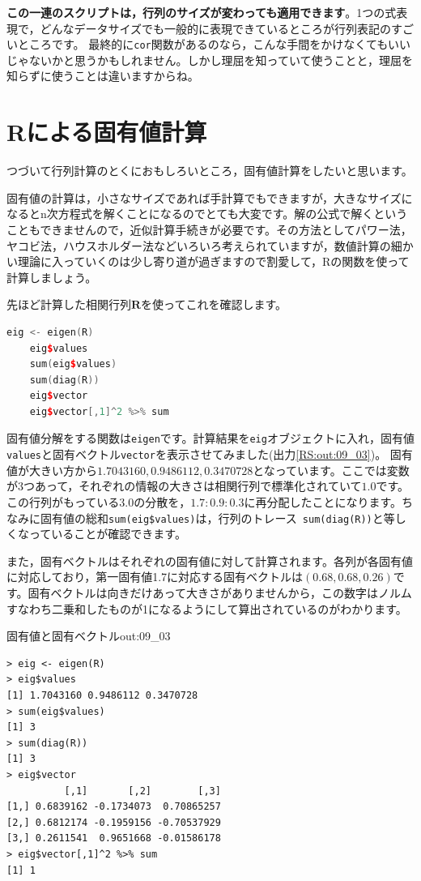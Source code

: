 \documentclass{ltjsbook}
\begin{document}
\textbf{この一連のスクリプトは，行列のサイズが変わっても適用できます}。1つの式表現で，どんなデータサイズでも一般的に表現できているところが行列表記のすごいところです。
最終的に\texttt{cor}関数があるのなら，こんな手間をかけなくてもいいじゃないかと思うかもしれません。しかし理屈を知っていて使うことと，理屈を知らずに使うことは違いますからね。

\section{Rによる固有値計算}
つづいて行列計算のとくにおもしろいところ，固有値計算をしたいと思います。

固有値の計算は，小さなサイズであれば手計算でもできますが，大きなサイズになるとn次方程式を解くことになるのでとても大変です。解の公式で解くということもできませんので，近似計算手続きが必要です。その方法としてパワー法，ヤコビ法，ハウスホルダー法などいろいろ考えられていますが，数値計算の細かい理論に入っていくのは少し寄り道が過ぎますので割愛して，Rの関数を使って計算しましょう。

先ほど計算した相関行列$\bm{R}$を使ってこれを確認します。

\begin{lstlisting}[language=c++,label={code:09_09},caption={相関行列の固有値分解}]
    eig <- eigen(R)
    eig$values
    sum(eig$values)
    sum(diag(R))
    eig$vector
    eig$vector[,1]^2 %>% sum
\end{lstlisting}

固有値分解をする関数は\texttt{eigen}です。計算結果を\texttt{eig}オブジェクトに入れ，固有値\verb|values|と固有ベクトル\verb|vector|を表示させてみました(出力\ref{RS:out:09_03})。
固有値が大きい方から$1.7043160,0.9486112,0.3470728$となっています。ここでは変数が3つあって，それぞれの情報の大きさは相関行列で標準化されていて$1.0$です。この行列がもっている$3.0$の分散を，$1.7 : 0.9 : 0.3$に再分配したことになります。ちなみに固有値の総和\verb|sum(eig$values)|は，行列のトレース\verb| sum(diag(R))|と等しくなっていることが確認できます。

また，固有ベクトルはそれぞれの固有値に対して計算されます。各列が各固有値に対応しており，第一固有値1.7に対応する固有ベクトルは$(0.68,0.68,0.26)$です。固有ベクトルは向きだけあって大きさがありませんから，この数字はノルムすなわち二乗和したものが1になるようにして算出されているのがわかります。
\begin{Rscreen}{固有値と固有ベクトル}{out:09_03}
	\begin{verbatim}
> eig <- eigen(R)
> eig$values
[1] 1.7043160 0.9486112 0.3470728
> sum(eig$values)
[1] 3
> sum(diag(R))
[1] 3
> eig$vector
          [,1]       [,2]        [,3]
[1,] 0.6839162 -0.1734073  0.70865257
[2,] 0.6812174 -0.1959156 -0.70537929
[3,] 0.2611541  0.9651668 -0.01586178
> eig$vector[,1]^2 %>% sum
[1] 1
\end{verbatim}
\end{Rscreen}
\end{document}
